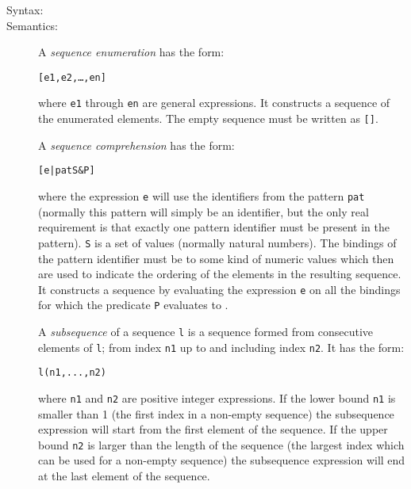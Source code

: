 \documentclass[\pformat,12pt]{article}
\begin{document}
\begin{description}
\item[Syntax:]




\item[Semantics:] A {\it sequence enumeration} has the form:
  \begin{alltt}
    [e1, e2, \ldots, en]
  \end{alltt}
  where {\tt e1} through {\tt en} are general expressions. It constructs a
  sequence of the enumerated elements. The empty sequence must be written
  as {\tt []}.

  A {\it sequence comprehension} has the form:
  \begin{alltt}
    [e | pat  S \& P]
  \end{alltt}
  where the expression {\tt e} will use the identifiers from the
  pattern {\tt pat} (normally this pattern will simply be an
  identifier, but the only real requirement is that exactly one pattern
  identifier must be present in the pattern). {\tt S} is
  a set of values (normally natural numbers). The bindings of the
  pattern identifier must be to some kind of numeric values which then
  are used to indicate the ordering of the elements in
  the resulting sequence. It constructs a sequence by evaluating the
  expression {\tt e} on all the bindings for which the predicate {\tt P}
  evaluates to .

  A {\it subsequence} of a sequence {\tt l} is a sequence formed from
  consecutive elements of {\tt l}; from index {\tt n1} up to and including
  index {\tt n2}. It has the form:
  \begin{alltt}
    l(n1, ..., n2)
  \end{alltt}
  where {\tt n1} and {\tt n2} are positive integer expressions.
  If the lower bound {\tt n1} is smaller than
  1 (the first index in a non-empty sequence) the subsequence
  expression will start from the first element of the sequence.
  If the upper bound {\tt n2} is larger
  than the length of the sequence (the largest index which can be used
  for a non-empty sequence) the subsequence expression will end at the
  last element of the sequence.


\end{description}
\end{document}
